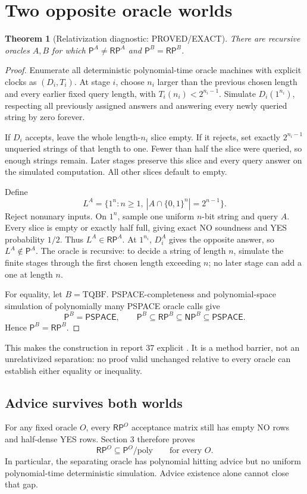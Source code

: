\documentclass[11pt]{article}
\newtheorem{theorem}{Theorem}[section]
\newcommand{\Pclass}{\mathsf P}
\newcommand{\RP}{\mathsf{RP}}
\newcommand{\NP}{\mathsf{NP}}
\newcommand{\PSPACE}{\mathsf{PSPACE}}
\begin{document}
\section{Two opposite oracle worlds}
\begin{theorem}[Relativization diagnostic: PROVED/EXACT]
There are recursive oracles $A,B$ for which
$\Pclass^A\ne\RP^A$ and $\Pclass^B=\RP^B$.
\end{theorem}
\begin{proof}
Enumerate all deterministic polynomial-time oracle machines with explicit
clocks as $(D_i,T_i)$. At stage $i$, choose $n_i$ larger than the previous
chosen length and every earlier fixed query length, with
$T_i(n_i)<2^{n_i-1}$. Simulate $D_i(1^{n_i})$, respecting all previously
assigned answers and answering every newly queried string by zero forever.

If $D_i$ accepts, leave the whole length-$n_i$ slice empty. If it rejects,
set exactly $2^{n_i-1}$ unqueried strings of that length to one. Fewer than
half the slice were queried, so enough strings remain. Later stages preserve
this slice and every query answer on the simulated computation. All other
slices default to empty.

Define
\[
 L^A=\{1^n:n\ge1,\ |A\cap\{0,1\}^n|=2^{n-1}\}.
\]
Reject nonunary inputs. On $1^n$, sample one uniform $n$-bit string and query
$A$. Every slice is empty or exactly half full, giving exact NO soundness and
YES probability $1/2$. Thus $L^A\in\RP^A$. At $1^{n_i}$, $D_i^A$ gives the
opposite answer, so $L^A\notin\Pclass^A$. The oracle is recursive: to decide
a string of length $n$, simulate the finite stages through the first chosen
length exceeding $n$; no later stage can add a one at length $n$.

For equality, let $B=\mathrm{TQBF}$. PSPACE-completeness and polynomial-space
simulation of polynomially many PSPACE oracle calls give
\[
 \Pclass^B=\PSPACE,\qquad
 \Pclass^B\subseteq\RP^B\subseteq\NP^B\subseteq\PSPACE.
\]
Hence $\Pclass^B=\RP^B$.
\end{proof}
This makes the construction in report 37 explicit \cite{r37}. It is a
method barrier, not an unrelativized separation: no proof valid unchanged
relative to every oracle can establish either equality or inequality.

\subsection*{Advice survives both worlds}
For any fixed oracle $O$, every $\RP^O$ acceptance matrix still has empty
NO rows and half-dense YES rows. Section 3 therefore proves
\[
                 \RP^O\subseteq\Pclass^O/\mathrm{poly}
                 \qquad\text{for every }O.
\]
In particular, the separating oracle has polynomial hitting advice but no
uniform polynomial-time deterministic simulation. Advice existence alone
cannot close that gap.
\end{document}
